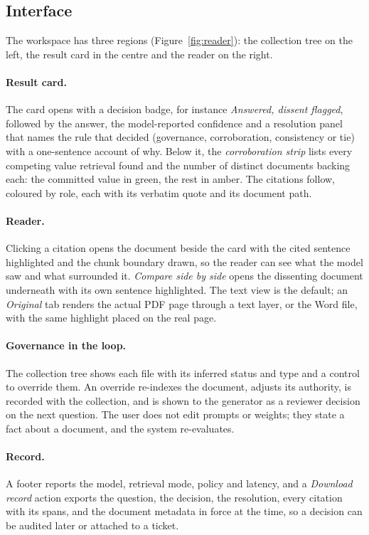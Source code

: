 \documentclass[11pt]{article}
\begin{document}
\subsection{Interface}
The workspace has three regions (Figure~\ref{fig:reader}): the collection
tree on the left, the result card in the centre and the reader on the right.

\paragraph{Result card.}
The card opens with a decision badge, for instance \emph{Answered, dissent
flagged}, followed by the answer, the model-reported confidence and a
resolution panel that names the rule that decided (governance,
corroboration, consistency or tie) with a one-sentence account of why. Below
it, the \emph{corroboration strip} lists every competing value retrieval
found and the number of distinct documents backing each: the committed value
in green, the rest in amber. The citations follow, coloured by role, each
with its verbatim quote and its document path.

\paragraph{Reader.}
Clicking a citation opens the document beside the card with the cited
sentence highlighted and the chunk boundary drawn, so the reader can see
what the model saw and what surrounded it. \emph{Compare side by side} opens
the dissenting document underneath with its own sentence highlighted. The
text view is the default; an \emph{Original} tab renders the actual PDF page
through a text layer, or the Word file, with the same highlight placed on
the real page.

\paragraph{Governance in the loop.}
The collection tree shows each file with its inferred status and type and a
control to override them. An override re-indexes the document, adjusts its
authority, is recorded with the collection, and is shown to the generator as
a reviewer decision on the next question. The user does not edit prompts or
weights; they state a fact about a document, and the system re-evaluates.

\paragraph{Record.}
A footer reports the model, retrieval mode, policy and latency, and a
\emph{Download record} action exports the question, the decision, the
resolution, every citation with its spans, and the document metadata in
force at the time, so a decision can be audited later or attached to a
ticket.
\end{document}
